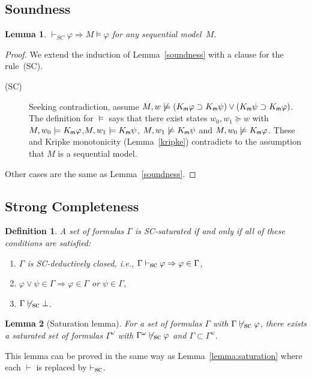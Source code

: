\documentclass[doctor]{iscs-thesis}
\newcommand{\vdashsc}{\vdash_{\mbox{\rm sc}}}
\newcommand{\memory}{{\sf m}}
\newtheorem{definition}{Definition}
\newtheorem{lemma}{Lemma}
\begin{document}
\subsection{Soundness}
\begin{lemma}
 \label{sc-sound}
 $\vdash_{SC} \varphi \Rightarrow M\models\varphi$ for any sequential model~$M$.
\end{lemma}
\begin{proof}
 We extend the induction of Lemma~\ref{soundness} with a clause for the rule~(SC).
\begin{description}
 \item[(SC)] Seeking contradiction, assume $M, w\not\models (K_\memory \varphi\supset
	    K_\memory \psi)\vee (K_\memory \psi\supset K_\memory \varphi)$.
	    The definition for $\models$ says that there exist states $w_0, w_1\succeq w$
	    with $M, w_0\models K_\memory\varphi$,\quad $M, w_1\models K_\memory\psi$,\quad
	    $M, w_1\not\models K_\memory\psi$ and $M, w_0\not\models K_\memory\varphi$.
	    These and Kripke monotonicity (Lemma~\ref{kripke}) contradicts to the
	    assumption that $M$ is a sequential model.
\end{description}
Other cases are the same as Lemma~\ref{soundness}.
\end{proof}
\subsection{Strong Completeness}
\begin{definition}
 A set of formulas $\Gamma$ is \textit{SC-saturated} if and only if all of these
 conditions are satisfied:
\begin{enumerate}
 \item $\Gamma$ is SC-deductively closed, i.e., $\Gamma\vdashsc\varphi\Rightarrow \varphi\in\Gamma$,
 \item $\varphi\vee\psi\in\Gamma \Rightarrow \varphi\in\Gamma$ or $\psi\in\Gamma$,
 \item $\Gamma\not\vdashsc\bot$.
\end{enumerate}
\end{definition}

\begin{lemma}[Saturation lemma]
\label{sc-saturation}
 For a set of formulas $\Gamma$ with $\Gamma\not\vdashsc\varphi$, there exists a saturated
 set of formulas $\Gamma^\omega$ with $\Gamma^\omega\not\vdashsc\varphi$
 and $\Gamma\subset \Gamma^\omega$.
\end{lemma}
\noindent 
This lemma can be proved in the same way as Lemma~\ref{lemma:saturation} where each $\vdash$ is replaced by $\vdashsc$.
\end{document}
